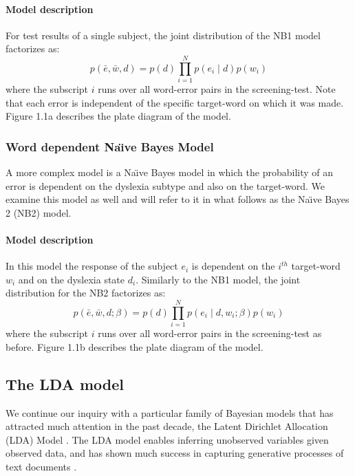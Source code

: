 \paragraph{Model description}
For test results of a single subject, the joint distribution of the NB1 model factorizes as:
\[ p(\bar{e}, \bar{w}, d) = p(d) \prod_{i=1}^N p(e_i \mid d) p(w_i) \]
where the subscript $ i $ runs over all word-error pairs in the screening-test. Note that each error is independent of the specific target-word on which it was made. Figure 1.1a describes the plate diagram of the model.

\subsubsection{Word dependent Na\"{\i}ve Bayes Model}
A more complex model is a Na\"{\i}ve Bayes model in which the probability of an error is dependent on the dyslexia subtype and also on the target-word. We examine this model as well and will refer to it in what follows as the Na\"{\i}ve Bayes 2 (NB2) model.

\vfill

\paragraph{Model description}
In this model the response of the subject $ e_i $ is dependent on the $ i^{th} $ target-word $ w_i $ and on the dyslexia state $ d_i $. Similarly to the NB1 model, the joint distribution for the NB2 factorizes as:
\[ p(\bar{e}, \bar{w}, d ; \beta) = p(d) \prod_{i=1}^N p(e_i \mid d, w_i ; \beta) p(w_i) \]
where the subscript $i$ runs over all word-error pairs in the screening-test as before. Figure 1.1b describes the plate diagram of the model.

\subsection{The LDA model}
We continue our inquiry with a particular family of Bayesian models that has attracted much attention in the past decade, the Latent Dirichlet Allocation (LDA) Model \citep{bnj03}. The LDA model enables inferring unobserved variables given observed data, and has shown much success in capturing generative processes of text documents \citep{bnj03, rgss04}.

